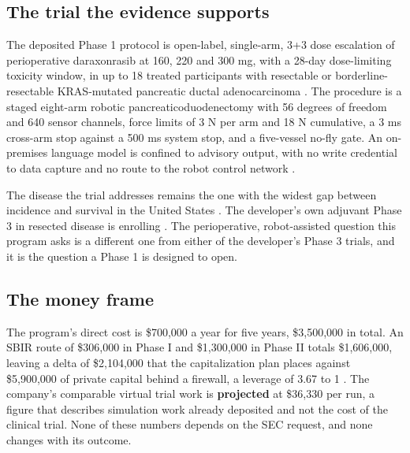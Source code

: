 \subsection{The trial the evidence supports}

The deposited Phase 1 protocol is open-label, single-arm, 3+3 dose escalation of
perioperative daraxonrasib at 160, 220 and 300 mg, with a 28-day dose-limiting
toxicity window, in up to 18 treated participants with resectable or
borderline-resectable KRAS-mutated pancreatic ductal adenocarcinoma
\cite{onpremwhippl}. The procedure is a staged eight-arm robotic
pancreaticoduodenectomy with 56 degrees of freedom and 640 sensor channels, force
limits of 3 N per arm and 18 N cumulative, a 3 ms cross-arm stop against a 500 ms
system stop, and a five-vessel no-fly gate. An on-premises language model is
confined to advisory output, with no write credential to data capture and no
route to the robot control network \cite{phase1ind}.

The disease the trial addresses remains the one with the widest gap between
incidence and survival in the United States \cite{siegel2025statistics}. The
developer's own adjuvant Phase 3 in resected disease is enrolling
\cite{ctgov304}. The perioperative, robot-assisted question this program asks is
a different one from either of the developer's Phase 3 trials, and it is the
question a Phase 1 is designed to open.

\subsection{The money frame}

The program's direct cost is \$700,000 a year for five years, \$3,500,000 in
total. An SBIR route of \$306,000 in Phase I and \$1,300,000 in Phase II totals
\$1,606,000, leaving a delta of \$2,104,000 that the capitalization plan places
against \$5,900,000 of private capital behind a firewall, a leverage of 3.67 to 1
\cite{capitalplan2026,tenapps2026}. The company's comparable virtual trial work is
\textbf{projected} at \$36,330 per run, a figure that describes simulation work
already deposited and not the cost of the clinical trial. None of these numbers
depends on the SEC request, and none changes with its outcome.
